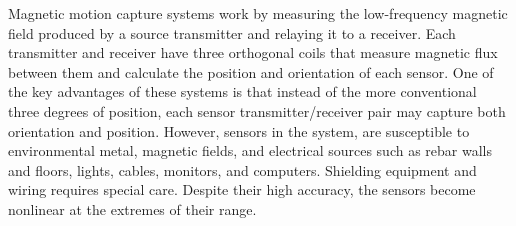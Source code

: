 Magnetic motion capture systems \cite{MOTION CAPTURE TO BUILD A FOUNDATION FOR A COMPUTER-CONTROLLED INSTRUMENT BY STUDY OF CLASSICAL GUITAR PERFORMANCE} work by measuring the low-frequency magnetic field produced by a source transmitter and relaying it to a receiver. Each transmitter and receiver have three orthogonal coils that measure magnetic flux between them and calculate the position and orientation of each sensor. One of the key advantages of these systems is that instead of the more conventional three degrees of position, each sensor transmitter/receiver pair may capture both orientation and position. However, sensors in the system, are susceptible to environmental metal, magnetic fields, and electrical sources such as rebar walls and floors, lights, cables, monitors, and computers. Shielding equipment and wiring requires special care. Despite their high accuracy, the sensors become nonlinear at the extremes of their range.